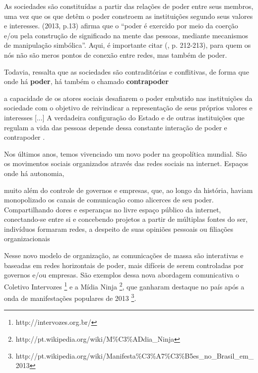 As sociedades são constituídas a partir das relações de poder entre seus membros, uma vez que os que detêm o poder constroem as instituições segundo seus valores e interesses.  (2013, p.13) afirma que o “poder é exercido por meio da coerção e/ou pela construção de significado na mente das pessoas, mediante mecanismos de manipulação simbólica”.  Aqui, é importante citar  (\citeyear{raffestin1993}, p. 212-213), para quem os nós não são meros pontos de conexão entre redes, mas também de poder.

Todavia,  ressalta que as sociedades são contraditórias e conflitivas, de forma que onde há \textbf{poder}, há também o chamado \textbf{contrapoder}

\begin{citacao}
a capacidade de os atores sociais desafiarem o poder embutido nas instituições da sociedade com o objetivo de reivindicar a representação de seus próprios valores e interesses [...] A verdadeira configuração do Estado e de outras instituições que regulam a vida das pessoas depende dessa constante interação de poder e contrapoder \cite[p .13]{castells2013}.
\end{citacao}

Nos últimos anos, temos vivenciado um novo poder na geopolítica mundial. São os movimentos sociais organizados através das redes sociais na internet. Espaços onde há autonomia,

\begin{citacao}
muito além do controle de governos e empresas, que, ao longo da história, haviam monopolizado os canais de comunicação como alicerces de seu poder. Compartilhando dores e esperanças no livre espaço público da internet, conectando-se entre si e concebendo projetos a partir de múltiplas fontes do ser, indivíduos formaram redes, a despeito de suas opiniões pessoais ou filiações organizacionais \cite[p .10]{castells2013}
\end{citacao}

Nesse novo modelo de organização, as comunicações de massa são interativas e baseadas em redes horizontais de poder, mais difíceis de serem controladas por governos e/ou empresas. São exemplos dessa nova abordagem comunicativa o Coletivo Intervozes \footnote{http://intervozes.org.br/} e a Mídia Ninja \footnote{http://pt.wikipedia.org/wiki/M\%C3\%ADdia\_Ninja}, que ganharam destaque no país após a onda de manifestações populares de 2013 \footnote{http://pt.wikipedia.org/wiki/Manifesta\%C3\%A7\%C3\%B5es\_no\_Brasil\_em\_2013}.

